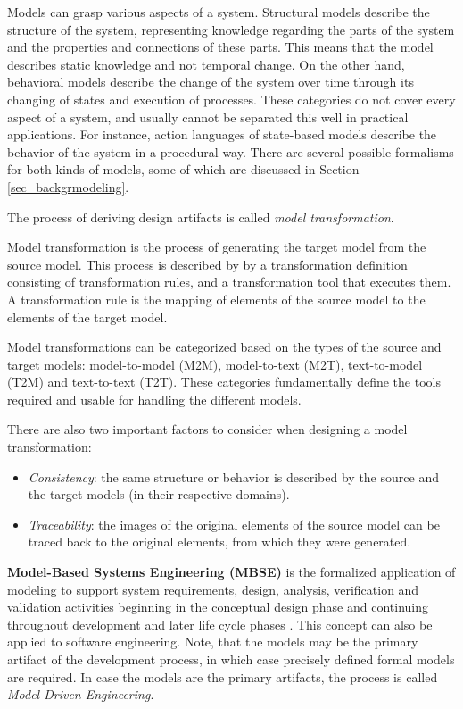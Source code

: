 Models can grasp various aspects of a system. Structural models describe the structure of the system, representing knowledge regarding the parts of the system and the properties and connections of these parts. This means that the model describes static knowledge and not temporal change. On the other hand, behavioral models describe the change of the system over time through its changing of states and execution of processes. These categories do not cover every aspect of a system, and usually cannot be separated this well in practical applications. For instance, action languages of state-based models describe the behavior of the system in a procedural way. There are several possible formalisms for both kinds of models, some of which are discussed in Section \ref{sec_backgrmodeling}.

The process of deriving design artifacts is called \textit{model transformation}.
\begin{definition}
	Model transformation is the process of generating the target model from the source model. This process is described by by a transformation definition consisting of transformation rules, and a transformation tool that executes them. A transformation rule is the mapping of elements of the source model to the elements of the target model. \cite{ModelTransformation}
\end{definition}

Model transformations can be categorized based on the types of the source and target models: model-to-model (M2M), model-to-text (M2T), text-to-model (T2M) and text-to-text (T2T). These categories fundamentally define the tools required and usable for handling the different models.

There are also two important factors to consider when designing a model transformation: 
\begin{itemize}
	\item \textit{Consistency}: the same structure or behavior is described by the source and the target models (in their respective domains).
	\item \textit{Traceability}: the images of the original elements of the source model can be traced back to the original elements, from which they were generated.
\end{itemize}

\textbf{Model-Based Systems Engineering (MBSE)} is the formalized application of modeling to support system requirements, design, analysis, verification and validation activities beginning in the conceptual design phase and continuing throughout development and later life cycle phases \cite{mbse}. This concept can also be applied to software engineering. Note, that the models may be the primary artifact of the development process, in which case precisely defined formal models are required. In case the models are the primary artifacts, the process is called \textit{Model-Driven Engineering}.

